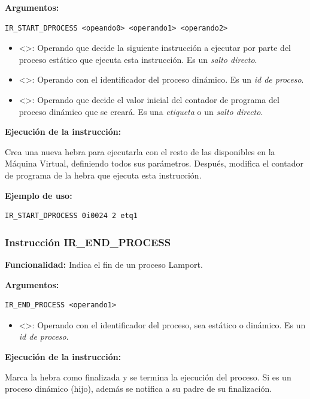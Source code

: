 \noindent
\textbf{Argumentos:}
\begin{verbatim}
IR_START_DPROCESS <opeando0> <operando1> <operando2>
\end{verbatim}
\begin{itemize}
    \item <>: Operando que decide la siguiente instrucción a ejecutar por parte del proceso estático que ejecuta esta instrucción. Es un \textit{salto directo}.
    \item <>: Operando con el identificador del proceso dinámico. Es un \textit{id de proceso}.
    \item <>: Operando que decide el valor inicial del contador de programa del proceso dinámico que se creará. Es una \textit{etiqueta} o un \textit{salto directo}.
\end{itemize}

\noindent
\textbf{Ejecución de la instrucción:}
\vspace{0.3cm}

\noindent
Crea una nueva hebra para ejecutarla con el resto de las disponibles en la Máquina Virtual, definiendo todos sus parámetros. Después, modifica el contador de programa de la hebra que ejecuta esta instrucción.
\vspace{0.3cm}

\noindent
\textbf{Ejemplo de uso:}
\begin{verbatim}
IR_START_DPROCESS 0i0024 2 etq1
\end{verbatim}

\subsubsection{Instrucción IR\_END\_PROCESS}\label{subsubsec:IR_END_PROCESS}
\noindent
\textbf{Funcionalidad:} Indica el fin de un proceso Lamport.

\noindent
\textbf{Argumentos:}
\begin{verbatim}
IR_END_PROCESS <operando1>
\end{verbatim}
\begin{itemize}
    \item <>: Operando con el identificador del proceso, sea estático o dinámico. Es un \textit{id de proceso}.
\end{itemize}

\noindent
\textbf{Ejecución de la instrucción:}
\vspace{0.3cm}

\noindent
Marca la hebra como finalizada y se termina la ejecución del proceso. Si es un proceso dinámico (hijo), además se notifica a su padre de su finalización.
\vspace{0.3cm}

